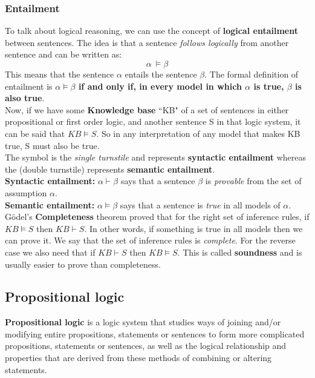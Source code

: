 \documentclass{article}
\newcommand{\n}[0]{\\[\baselineskip]}
\begin{document}
\subsubsection{Entailment}
To talk about logical reasoning, we can use the concept of \textbf{logical entailment} between sentences. The idea is that a sentence \textit{follows logically} from another sentence and can be written as:
\begin{equation}
\alpha\ \vDash \beta
\end{equation}
This means that the sentence $\alpha$ entails the sentence $\beta$. The formal definition of entailment is \textbf{$\alpha \vDash \beta$ if and only if, in every model in which $\alpha$ is true, $\beta$ is also true}. 
\n
Now, if we have some \textbf{Knowledge base} ``KB" of a set of sentences in either propositional or first order logic, and another sentence S in that logic system, it can be said that $KB \vDash S$. So in any interpretation of any model that makes KB true, S must also be true.
\n
The symbol \vdash is the \textit{single turnstile} and represents \textbf{syntactic entailment} whereas the \vDash (double turnstile) represents \textbf{semantic entailment}.
\n
\textbf{Syntactic entailment:} $\alpha \vdash \beta$ says that a sentence $\beta$ is \textit{provable} from the set of assumption $\alpha$. 
\\
\textbf{Semantic entailment:} $\alpha \vDash \beta$ says that a sentence is \textit{true} in all models of $\alpha$.
\n
G\"{o}del's \textbf{Completeness} theorem proved that for the right set of inference rules, if $KB \vDash S$ then $KB \vdash S$. In other words, if something is true in all models then we can prove it. We say that the set of inference rules is \textit{complete}. For the reverse case we also need that if $KB \vdash S$ then $KB \vDash S$. This is called \textbf{soundness} and is usually easier to prove than completeness.
\subsection{Propositional logic}
\textbf{Propositional logic} is a logic system that studies ways of joining and/or modifying entire propositions, statements or sentences to form more complicated propositions, statements or sentences, as well as the logical relationship and properties that are derived from these methods of combining or altering statements. 
\end{document}
